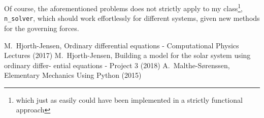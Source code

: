 \documentclass[10pt,showpacs,preprintnumbers,amsmath,amssymb,nofootinbib,aps,prl,twocolumn,groupedaddress,superscriptaddress,showkeys]{revtex4-1}
\begin{document}
  Of course, the aforementioned problems does not strictly apply to my class\footnote{which just as easily could have been implemented in a strictly functional approach}, \lstinline{n_solver}, which should work effortlessly for different systems, given new methods for the governing forces.


\begin{thebibliography}{99}
 M.~Hjorth-Jensen, Ordinary differential equations - Computational Physics Lectures (2017)
 M.~Hjorth-Jensen, Building a model for the solar system using ordinary differ-
ential equations - Project 3 (2018)
 A.~Malthe-Sørenssen, Elementary Mechanics Using Python (2015)
\end{thebibliography}
\end{document}
